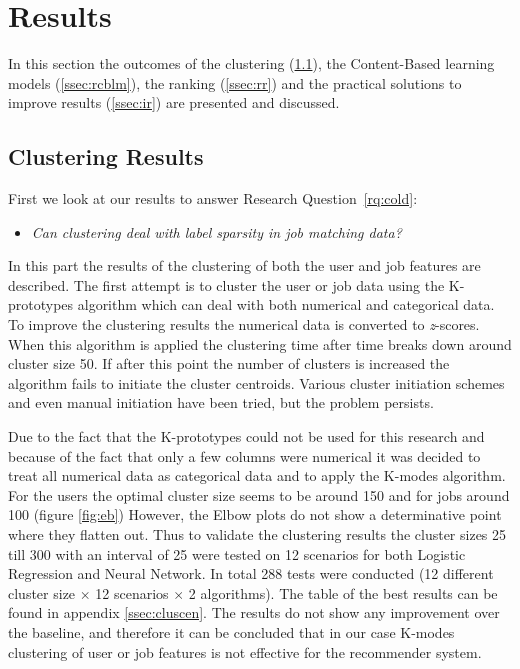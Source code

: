 \section{Results}
\label{sec:rslts}

In this section the outcomes of the clustering (\ref{ssec:clures}), the Content-Based learning models (\ref{ssec:rcblm}), the ranking (\ref{ssec:rr}) and the practical solutions to improve results (\ref{ssec:ir}) are presented and discussed.

\subsection{Clustering Results}
\label{ssec:clures}

First we look at our results to answer Research Question~\ref{rq:cold}:
\begin{itemize}
	\item[] \em Can clustering deal with label sparsity in job matching data?
\end{itemize}

\noindent In this part the results of the clustering of both the user and job features are described.
The first attempt is to cluster the user or job data using the K-prototypes algorithm which can deal with both numerical and categorical data.
To improve the clustering results the numerical data is converted to \textit{z}-scores.
When this algorithm is applied the clustering time after time breaks down around cluster size 50. If after this point the number of clusters is increased the algorithm fails to initiate the cluster centroids.
Various cluster initiation schemes and even manual initiation have been tried, but the problem persists.

Due to the fact that the K-prototypes could not be used for this research and because of the fact that only a few columns were numerical it was decided to treat all numerical data as categorical data and to apply the K-modes algorithm.
For the users the optimal cluster size seems to be around 150 and for jobs around 100 (figure \ref{fig:eb})
However, the Elbow plots do not show a determinative point where they flatten out.
Thus to validate the clustering results the cluster sizes 25 till 300 with an interval of 25 were tested on 12 scenarios for both Logistic Regression and Neural Network.
In total 288 tests were conducted (12 different cluster size $\times$ 12 scenarios $\times$ 2 algorithms). 
The table of the best results can be found in appendix \ref{ssec:cluscen}.
The results do not show any improvement over the baseline, and therefore it can be concluded that in our case K-modes clustering of user or job features is not effective for the recommender system.

